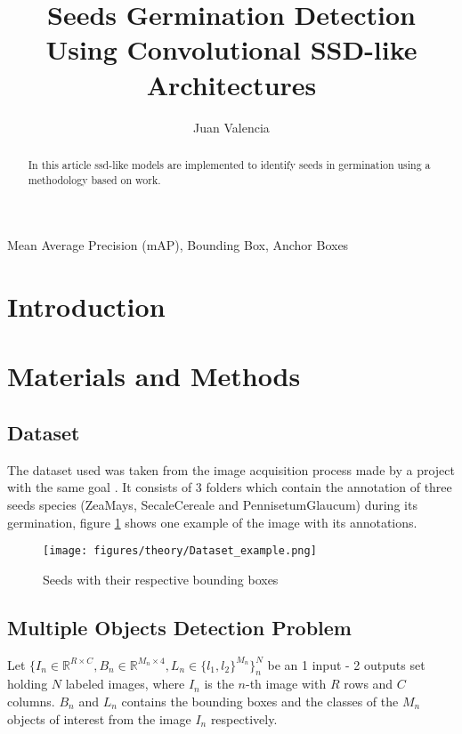 \documentclass{IEEEtran}
\title{Seeds Germination Detection Using Convolutional SSD-like Architectures}
\author{Juan Valencia}
\begin{document}
\maketitle

\begin{abstract}
    In this article ssd-like models are implemented to identify seeds in
    germination using a methodology based on \cite{main:seedproject} work.
\end{abstract}

\begin{IEEEkeywords}
    Mean Average Precision (mAP), Bounding Box, Anchor Boxes
\end{IEEEkeywords}

\section{Introduction}

\section{Materials and Methods}

\subsection{Dataset}
The dataset used was taken from the image acquisition process made by a project
with the same goal \cite{main:seedproject}. It consists of 3 folders which
contain the annotation of three seeds species (ZeaMays, SecaleCereale and
PennisetumGlaucum) during its germination, figure \ref{fig:zeamays_demo} shows
one example of the image with its annotations.

\begin{figure}[h]
   \centering
   \texttt{[image: figures/theory/Dataset\_example.png]}
   \label{fig:zeamays_demo}
   \caption{Seeds with their respective bounding boxes}
\end{figure}


\subsection{Multiple Objects Detection Problem}
Let $\{ I_n \in \mathbb{R}^{R \times C}, B_n \in \mathbb{R}^{M_n \times 4}, L_n
\in \{l_1, l_2\}^{M_n}\}^N_n$ be an 1 input - 2 outputs set holding $N$
labeled images, where $I_n$ is the $n$-th image with $R$ rows and $C$ columns.
$B_n$ and $L_n$ contains the bounding boxes and the classes of the $M_n$ objects
of interest from the image $I_n$ respectively.\par
\end{document}
